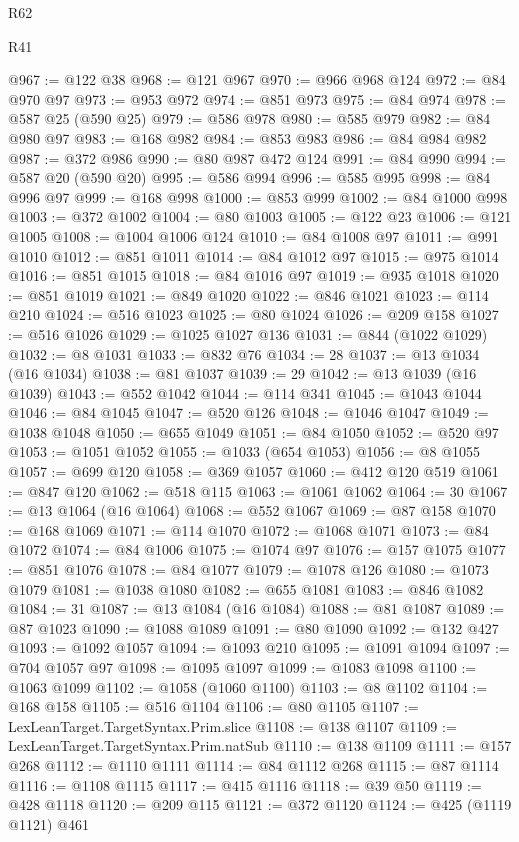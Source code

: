 \begin{lexlean}{R62}
\begin{lexlean}{R41}
\begin{coremodule}
{{{{{{{{{{{{{{{{{{{{{{{{{{{{{{{{{{{{{{{{{{{{{{{{{{{{{{{{{{{{{{{{{{{{{{{{{{{{{{{{{{{{{{{@967 := @122 @38
@968 := @121 @967
@970 := @966 @968 @124
@972 := @84 @970 @97
@973 := @953 @972
@974 := @851 @973
@975 := @84 @974
@978 := @587 @25 (@590 @25)
@979 := @586 @978
@980 := @585 @979
@982 := @84 @980 @97
@983 := @168 @982
@984 := @853 @983
@986 := @84 @984 @982
@987 := @372 @986
@990 := @80 @987 @472 @124
@991 := @84 @990
@994 := @587 @20 (@590 @20)
@995 := @586 @994
@996 := @585 @995
@998 := @84 @996 @97
@999 := @168 @998
@1000 := @853 @999
@1002 := @84 @1000 @998
@1003 := @372 @1002
@1004 := @80 @1003
@1005 := @122 @23
@1006 := @121 @1005
@1008 := @1004 @1006 @124
@1010 := @84 @1008 @97
@1011 := @991 @1010
@1012 := @851 @1011
@1014 := @84 @1012 @97
@1015 := @975 @1014
@1016 := @851 @1015
@1018 := @84 @1016 @97
@1019 := @935 @1018
@1020 := @851 @1019
@1021 := @849 @1020
@1022 := @846 @1021
@1023 := @114 @210
@1024 := @516 @1023
@1025 := @80 @1024
@1026 := @209 @158
@1027 := @516 @1026
@1029 := @1025 @1027 @136
@1031 := @844 (@1022 @1029)
@1032 := @8 @1031
@1033 := @832 @76
@1034 := 28
@1037 := @13 @1034 (@16 @1034)
@1038 := @81 @1037
@1039 := 29
@1042 := @13 @1039 (@16 @1039)
@1043 := @552 @1042
@1044 := @114 @341
@1045 := @1043 @1044
@1046 := @84 @1045
@1047 := @520 @126
@1048 := @1046 @1047
@1049 := @1038 @1048
@1050 := @655 @1049
@1051 := @84 @1050
@1052 := @520 @97
@1053 := @1051 @1052
@1055 := @1033 (@654 @1053)
@1056 := @8 @1055
@1057 := @699 @120
@1058 := @369 @1057
@1060 := @412 @120 @519
@1061 := @847 @120
@1062 := @518 @115
@1063 := @1061 @1062
@1064 := 30
@1067 := @13 @1064 (@16 @1064)
@1068 := @552 @1067
@1069 := @87 @158
@1070 := @168 @1069
@1071 := @114 @1070
@1072 := @1068 @1071
@1073 := @84 @1072
@1074 := @84 @1006
@1075 := @1074 @97
@1076 := @157 @1075
@1077 := @851 @1076
@1078 := @84 @1077
@1079 := @1078 @126
@1080 := @1073 @1079
@1081 := @1038 @1080
@1082 := @655 @1081
@1083 := @846 @1082
@1084 := 31
@1087 := @13 @1084 (@16 @1084)
@1088 := @81 @1087
@1089 := @87 @1023
@1090 := @1088 @1089
@1091 := @80 @1090
@1092 := @132 @427
@1093 := @1092 @1057
@1094 := @1093 @210
@1095 := @1091 @1094
@1097 := @704 @1057 @97
@1098 := @1095 @1097
@1099 := @1083 @1098
@1100 := @1063 @1099
@1102 := @1058 (@1060 @1100)
@1103 := @8 @1102
@1104 := @168 @158
@1105 := @516 @1104
@1106 := @80 @1105
@1107 := LexLeanTarget.TargetSyntax.Prim.slice
@1108 := @138 @1107
@1109 := LexLeanTarget.TargetSyntax.Prim.natSub
@1110 := @138 @1109
@1111 := @157 @268
@1112 := @1110 @1111
@1114 := @84 @1112 @268
@1115 := @87 @1114
@1116 := @1108 @1115
@1117 := @415 @1116
@1118 := @39 @50
@1119 := @428 @1118
@1120 := @209 @115
@1121 := @372 @1120
@1124 := @425 (@1119 @1121) @461
}}}}}}}}}}}}}}}}}}}}}}}}}}}}}}}}}}}}}}}}}}}}}}}}}}}}}}}}}}}}}}}}}}}}}}}}}}}}}}}}}}}}}}}
\end{coremodule}
\end{lexlean}
\end{lexlean}
